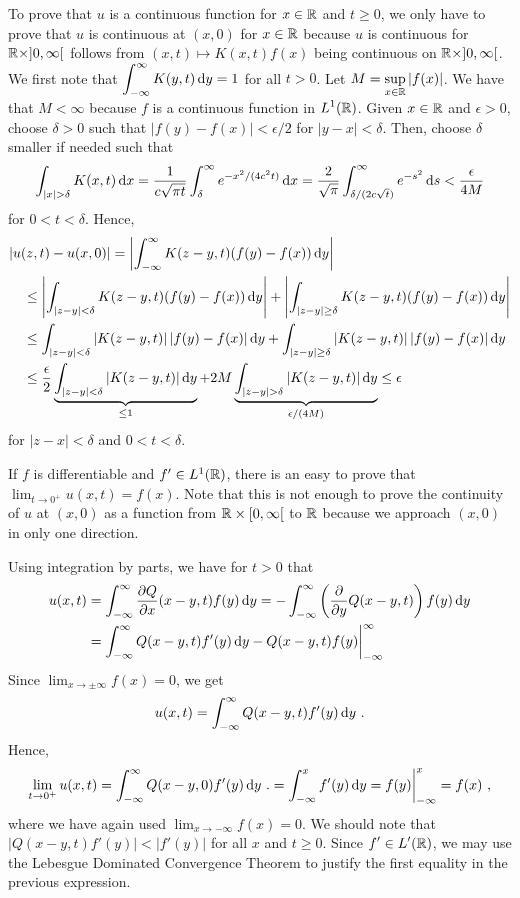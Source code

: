 To prove that $u$ is a continuous function for $x\in \RR$ and $t\geq 0$,
we only have to prove that $u$ is continuous at $(x,0)$ for $x \in \RR$
because $u$ is continuous for $\RR \times ]0,\infty[$ follows from
$(x,t) \mapsto K(x,t)f(x)$ being continuous on $\RR \times ]0,\infty[$.
We first note that
$\displaystyle \int_{-\infty}^{\infty} K(y,t) \dx{y} = 1$ for all $t>0$.
Let $\displaystyle M = \sup_{x \in \RR} |f(x)|$.  We have that
$M < \infty$ because $f$ is a continuous function in $\displaystyle L^1(\RR)$.
Given $x \in \RR$ and $\epsilon>0$, choose $\delta > 0$ such that
$|f(y) - f(x)| < \epsilon/2$ for $|y-x|< \delta$.
Then, choose $\delta$ smaller if needed such that
\[
\int_{|x|>\delta} K(x,t) \dx{x}
= \frac{1}{c \sqrt{\pi t}} \int_{\delta}^\infty e^{-x^2/(4c^2t)} \dx{x}
= \frac{2}{\sqrt{\pi}} \int_{\delta/(2c\sqrt{t})}^\infty e^{-s^2} \dx{s}
< \frac{\epsilon}{4M}
\]
for $0<t<\delta$.  Hence,
\begin{align*}
&|u(z,t) - u(x,0)|
= \left| \int_{-\infty}^{\infty} K(z-y,t) (f(y) - f(x)) \dx{y} \right| \\
&\quad \leq \left| \int_{|z-y|<\delta} K(z-y,t) (f(y) - f(x)) \dx{y} \right|
+ \left| \int_{|z-y|\geq \delta} K(z-y,t) (f(y) - f(x)) \dx{y} \right| \\
&\quad \leq \int_{|z-y|<\delta} |K(z-y,t)|\, |f(y) - f(x)| \dx{y} 
+ \int_{|z-y| \geq \delta} |K(z-y,t)|\,|f(y) - f(x)| \dx{y} \\
&\quad \leq \frac{\epsilon}{2}
\underbrace{\int_{|z-y|<\delta} |K(z-y,t)| \dx{y}}_{\leq 1}
+ 2 M \underbrace{\int_{|z-y|>\delta} |K(z-y,t)| \dx{y}}_{\epsilon/(4M)}
\leq \epsilon
\end{align*}
for $|z-x| < \delta$ and $0<t<\delta$.

\begin{rmk}
If $f$ is differentiable and $f' \in L^1(\RR)$, there is an easy to prove that
$\displaystyle \lim_{t\to 0^+} u(x,t) = f(x)$.  Note that this is not
enough to prove the continuity of $u$ at $(x,0)$ as a function from
$\RR \times [0,\infty[$ to $\RR$ because we approach $(x,0)$ in only
one direction.

Using integration by parts, we have for $t>0$ that
\begin{align*}
u(x,t) &= \int_{-\infty}^{\infty} \pdydx{Q}{x}(x-y,t) f(y) \dx{y}
= -\int_{-\infty}^{\infty} \left(\pdfdx{Q(x-y,t)}{y}\right) f(y) \dx{y} \\
&= \int_{-\infty}^{\infty} Q(x-y,t) f'(y)\dx{y}
- Q(x-y,t) f(y) \bigg|_{-\infty}^{\infty}
\end{align*}
Since $\displaystyle \lim_{x\to \pm\infty}f(x) = 0$, we get
\[
u(x,t) = \int_{-\infty}^{\infty} Q(x-y,t) f'(y)\dx{y} \ .
\]
Hence,
\[
\lim_{t\to 0^+} u(x,t)
= \int_{-\infty}^{\infty} Q(x-y,0) f'(y)\dx{y} \ .
= \int_{-\infty}^x f'(y) \dx{y} = f(y)\bigg|_{-\infty}^x = f(x) \ ,
\]
where we have again used $\displaystyle \lim_{x\to -\infty}f(x) = 0$.
We should note that $|Q(x-y,t) f'(y)| < |f'(y)|$ for all $x$ and
$t\geq 0$.  Since $\displaystyle f' \in L'(\RR)$, we may use the
Lebesgue Dominated Convergence Theorem to justify the first equality
in the previous expression.
\end{rmk}

